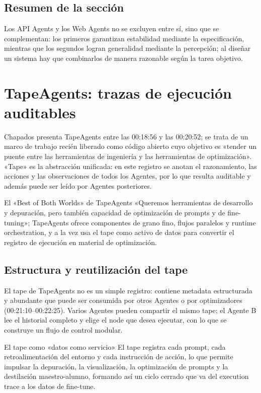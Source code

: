 \documentclass[a4paper]{article}
\begin{document}
\subsection{Resumen de la sección}
Los API Agents y los Web Agents no se excluyen entre sí, sino que se complementan: los primeros garantizan estabilidad mediante la especificación, mientras que los segundos logran generalidad mediante la percepción; al diseñar un sistema hay que combinarlos de manera razonable según la tarea objetivo.

\section{TapeAgents: trazas de ejecución auditables}
Chapados presenta TapeAgents entre las 00:18:56 y las 00:20:52; se trata de un marco de trabajo recién liberado como código abierto cuyo objetivo es «tender un puente entre las herramientas de ingeniería y las herramientas de optimización». «Tape» es la abstracción unificada: en este registro se anotan el razonamiento, las acciones y las observaciones de todos los Agentes, por lo que resulta auditable y además puede ser leído por Agentes posteriores.

\begin{importantbox}{El «Best of Both Worlds» de TapeAgents}
«Queremos herramientas de desarrollo y depuración, pero también capacidad de optimización de prompts y de fine-tuning»; TapeAgents ofrece componentes de grano fino, flujos paralelos y runtime orchestration, y a la vez usa el tape como activo de datos para convertir el registro de ejecución en material de optimización.
\end{importantbox}

\subsection{Estructura y reutilización del tape}
El tape de TapeAgents no es un simple registro: contiene metadata estructurada y abundante que puede ser consumida por otros Agentes o por optimizadores (00:21:10--00:22:25). Varios Agentes pueden compartir el mismo tape; el Agente B lee el historial completo y elige el node que desea ejecutar, con lo que se construye un flujo de control modular.

\begin{knowledgebox}{El tape como «datos como servicio»}
El tape registra cada prompt, cada retroalimentación del entorno y cada instrucción de acción, lo que permite impulsar la depuración, la visualización, la optimización de prompts y la destilación maestro-alumno, formando así un ciclo cerrado que va del execution trace a los datos de fine-tune.
\end{knowledgebox}
\end{document}
